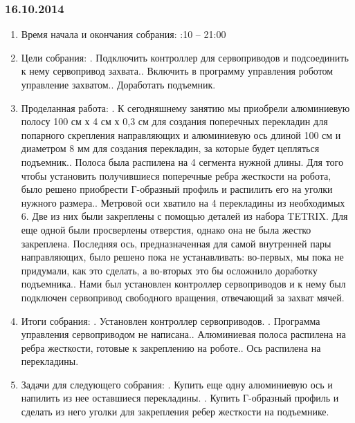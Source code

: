 \documentclass[12pt]{article}
\begin{document}
	      \subsubsection{16.10.2014}
	      \begin{enumerate}
	      	\item Время начала и окончания собрания:
	      	:10 – 21:00
	      	\item Цели собрания:
	      	.	Подключить контроллер для сервоприводов и подсоединить к нему сервопривод захвата..	Включить в программу управления роботом управление захватом..	Доработать подъемник.
	      	
	      	\item Проделанная работа:
	      	.	К сегодняшнему занятию мы приобрели алюминиевую полосу 100 см х 4 см х 0,3 см для создания поперечных перекладин для попарного скрепления направляющих и алюминиевую ось длиной 100 см и диаметром 8 мм для создания перекладин, за которые будет цепляться подъемник..	Полоса была распилена на 4 сегмента нужной длины. Для того чтобы установить получившиеся поперечные ребра жесткости на робота, было решено приобрести Г-образный профиль и распилить его на уголки нужного размера..	Метровой оси хватило на 4 перекладины из необходимых 6. Две из них были закреплены с помощью деталей из набора TETRIX. Для еще одной были просверлены отверстия, однако она не была жестко закреплена. Последняя ось, предназначенная для самой внутренней пары направляющих, было решено пока не устанавливать: во-первых, мы пока не придумали, как это сделать, а во-вторых это бы осложнило доработку подъемника..	Нами был установлен контроллер сервоприводов и к нему был подключен сервопривод свободного вращения, отвечающий за захват мячей.\newline

	      	\item Итоги собрания:
	      	.	Установлен контроллер сервоприводов.
	      	.	Программа управления сервоприводом не написана..	Алюминиевая полоса распилена на ребра жесткости, готовые к закреплению на роботе..	Ось распилена на перекладины.
	      	
	      	\item Задачи для следующего собрания:
	      	.	Купить еще одну алюминиевую ось и напилить из нее оставшиеся перекладины.
	      	.	Купить Г-образный профиль и сделать из него уголки для закрепления ребер жесткости на подъемнике.
	      \end{enumerate}
	      \newpage
\end{document}
